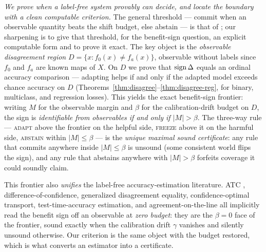 \emph{We prove when a label-free system provably can decide, and locate the
boundary with a clean computable criterion.} The general threshold ---
commit when an observable quantity beats the shift budget, else abstain --- is
that of \cite{kalai2021abstain}; our sharpening is to give that threshold, for the
benefit-sign question, an explicit computable form and to prove it exact. The
key object is the \emph{observable disagreement region} $D = \{x : f_0(x) \neq
f_a(x)\}$, observable without labels since $f_0$ and $f_a$ are known maps of $X$.
On $D$ we prove that $\operatorname{sign}\Delta$ equals an ordinal accuracy comparison ---
adapting helps if and only if the adapted model exceeds chance accuracy on $D$
(Theorems~\ref{thm:disagree}--\ref{thm:disagree-reg}, for binary, multiclass, and
regression losses). This yields the exact benefit-sign frontier: writing $M$ for the
observable margin and $\beta$ for the calibration-drift budget on $D$, the sign is
\emph{identifiable from observables if and only if $|M| > \beta$}. The three-way
rule --- \textsc{adapt} above the frontier on the helpful side, \textsc{freeze}
above it on the harmful side, \textsc{abstain} within $|M| \le \beta$ --- is the
\emph{unique maximal sound certificate}: any rule that commits anywhere inside
$|M| \le \beta$ is unsound (some consistent world flips the sign), and any rule that
abstains anywhere with $|M| > \beta$ forfeits coverage it could soundly claim.

This frontier also \emph{unifies} the label-free accuracy-estimation literature.
ATC \cite{garg2022atc}, difference-of-confidence, generalized disagreement
equality, confidence-optimal transport, test-time-accuracy estimation, and
agreement-on-the-line \cite{baek2022agreement} all implicitly read the benefit sign
off an observable at \emph{zero budget}: they are the $\beta = 0$ face of the
frontier, sound exactly when the calibration drift $\gamma$ vanishes and silently
unsound otherwise. Our criterion is the same object with the budget restored,
which is what converts an estimator into a certificate.

